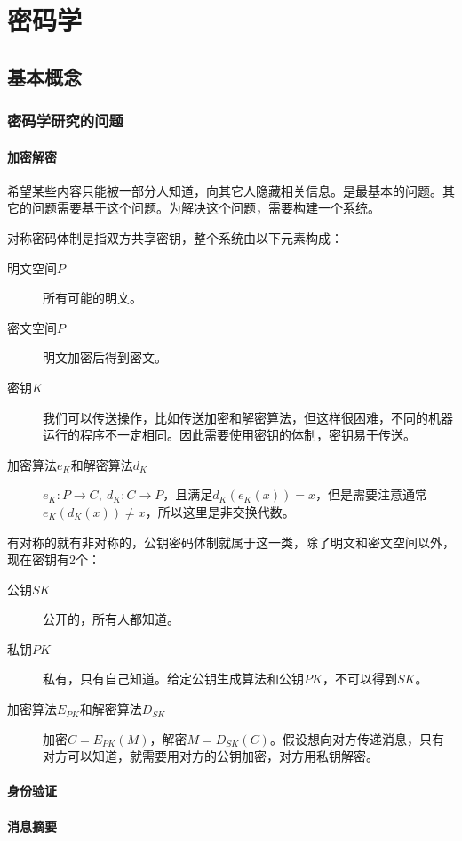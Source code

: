 \chapter{密码学}
\section{基本概念}
\subsection{密码学研究的问题}
\subsubsection{加密解密}
希望某些内容只能被一部分人知道，向其它人隐藏相关信息。是最基本的问题。其它的问题需要基于这个问题。为解决这个问题，需要构建一个系统。

对称密码体制是指双方共享密钥，整个系统由以下元素构成：

\begin{description}
\item[明文空间$P$] 所有可能的明文。
\item[密文空间$P$] 明文加密后得到密文。
\item[密钥$K$] 我们可以传送操作，比如传送加密和解密算法，但这样很困难，不同的机器运行的程序不一定相同。因此需要使用密钥的体制，密钥易于传送。
\item[加密算法$e_K$和解密算法$d_K$] $e_K: P\rightarrow C,\ d_K: C\rightarrow P$，且满足$d_K(e_K(x))=x$，但是需要注意通常$e_K(d_K(x))\neq x$，所以这里是非交换代数。
\end{description}

有对称的就有非对称的，公钥密码体制就属于这一类，除了明文和密文空间以外，现在密钥有2个：
\begin{description}
\item[公钥$SK$] 公开的，所有人都知道。
\item[私钥$PK$] 私有，只有自己知道。给定公钥生成算法和公钥$PK$，不可以得到$SK$。
\item[加密算法$E_{PK}$和解密算法$D_{SK}$] 加密$C=E_{PK}(M)$，解密$M=D_{SK}(C)$。假设想向对方传递消息，只有对方可以知道，就需要用对方的公钥加密，对方用私钥解密。
\end{description}
\subsubsection{身份验证}

\subsubsection{消息摘要}

